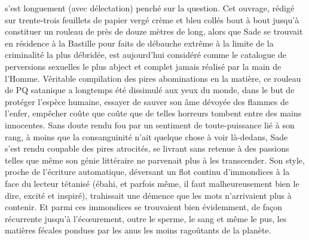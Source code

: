 %
s’est longuement (avec délectation) penché sur la question. Cet ouvrage, rédigé sur trente-trois feuillets de papier vergé crème et bleu collés bout à bout jusqu’à constituer un rouleau de près de douze mètres de long, alors que Sade se trouvait en résidence à la Bastille pour faits de débauche extrême à la limite de la criminalité la plus débridée, est aujourd’hui considéré comme le catalogue de perversions sexuelles le plus abject et complet jamais réalisé par la main de l’Homme. Véritable compilation des pires abominations en la matière, ce rouleau de PQ satanique a longtemps été dissimulé aux yeux du monde, dans le but de protéger l’espèce humaine, essayer de sauver son âme dévoyée des flammes de l’enfer, empêcher coûte que coûte que de telles horreurs tombent entre des mains innocentes. Sans doute rendu fou par un sentiment de toute-puissance lié à son rang, à moins que la consanguinité %
%
%
n’ait quelque chose à voir là-dedans, Sade s’est rendu coupable des pires atrocités, se livrant sans retenue à des passions telles que même son génie littéraire ne parvenait plus à les transcender. Son style, proche de l’écriture automatique, déversant un flot continu d’immondices à la face du lecteur tétanisé (ébahi, et parfois même, il faut malheureusement bien le dire, excité et inspiré), trahissait une démence que les mots n’arrivaient plus à contenir. Et parmi ces immondices se trouvaient bien évidemment, de façon récurrente jusqu’à l’écœurement, outre le sperme, le sang et même le pus, les matières fécales pondues par les anus les moins ragoûtants de la planète. 

